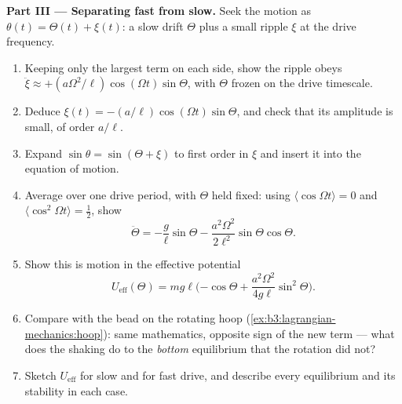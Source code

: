 \begin{problem}
\medskip\noindent\textbf{Part III --- Separating fast from slow.}
Seek the motion as $\theta(t) = \Theta(t) + \xi(t)$: a slow drift
$\Theta$ plus a small ripple $\xi$ at the drive frequency.
\begin{enumerate}[resume]
  \item Keeping only the largest term on each side, show the ripple
        obeys $\ddot\xi \approx +(a\Omega^2/\ell)\cos(\Omega t)
        \sin\Theta$, with $\Theta$ frozen on the drive timescale.
  \item Deduce $\xi(t) = -(a/\ell)\cos(\Omega t)\sin\Theta$, and check
        that its amplitude is small, of order $a/\ell$.
  \item Expand $\sin\theta = \sin(\Theta + \xi)$ to first order in
        $\xi$ and insert it into the equation of motion.
  \item Average over one drive period, with $\Theta$ held fixed:
        using $\langle\cos\Omega t\rangle = 0$ and
        $\langle\cos^2\Omega t\rangle = \tfrac12$, show
        \[
        \ddot\Theta = -\frac{g}{\ell}\sin\Theta
         - \frac{a^2\Omega^2}{2\ell^2}\sin\Theta\cos\Theta .
        \]
  \item Show this is motion in the effective potential
        \[
        U_{\text{eff}}(\Theta) = mg\ell\Big({-\cos\Theta}
         + \frac{a^2\Omega^2}{4g\ell}\sin^2\Theta\Big) .
        \]
  \item Compare with the bead on the rotating hoop
        (\cref{ex:b3:lagrangian-mechanics:hoop}): same mathematics,
        opposite sign of the new term --- what does the shaking do to
        the \emph{bottom} equilibrium that the rotation did not?
  \item Sketch $U_{\text{eff}}$ for slow and for fast drive, and
        describe every equilibrium and its stability in each case.
\end{enumerate}


\end{problem}
